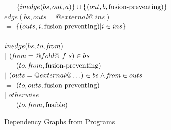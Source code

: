 \begin{figure}
\begin{tabbing}
    \> $=$    \> $\{inedge(bs, out, a) \}           \cup      \{(out, b, \mbox{fusion-preventing}) \}$ \\
$edge(bs, outs = @external@~ins)$  \\
    \> $=$    \> $\{(outs,i, \mbox{fusion-preventing}) | i \in ins \}$ \\
\\
$inedge(bs,to,\mathit{from})$ \\
    \> $|$ \> $(\mathit{from} = @fold@~f~s) \in bs$     \\
    \> $=$ \> $(to, \mathit{from}, \mbox{fusion-preventing})$  \\
    \> $|$ \> $(outs = @external@ \ldots) \in bs     \wedge \mathit{from} \in outs$     \\
    \> $=$ \> $(to, outs, \mbox{fusion-preventing})$  \\
    \> $|$ \> $otherwise$                      \\
    \> $=$ \> $(to, \mathit{from}, \mathrm{fusible})$
\end{tabbing}

\caption{Dependency Graphs from Programs}
\label{f:DependencyGraph}
\end{figure}


